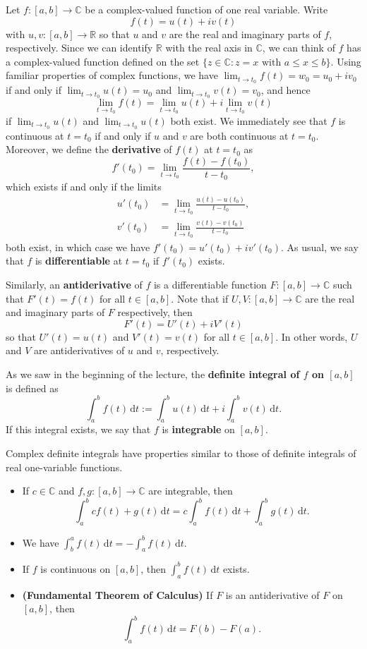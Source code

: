 \documentclass[10pt]{article}
\newcommand{\R}{\mathbb{R}}
\newcommand{\C}{\mathbb{C}}
\newcommand{\dd}{\,\mathrm{d}}
\theoremstyle{newstyle}
\begin{document}
Let $f : [a, b] \to \C$ be a complex-valued function of one real variable. Write 
\[ f(t) = u(t) + iv(t) \]
with $u, v : [a, b] \to \R$ so that $u$ and $v$ are the real and imaginary parts of $f$, respectively. 
Since we can identify $\R$ with the real axis in $\C$, we can think of $f$ has a complex-valued 
function defined on the set $\{z \in \C : z = x \text{ with } a \leq x \leq b\}$. 
Using familiar properties of complex functions, we have $\lim_{t\to t_0} f(t) 
= w_0 = u_0 + iv_0$ if and only if $\lim_{t\to t_0} u(t) = u_0$ and 
$\lim_{t\to t_0} v(t) = v_0$, and hence 
\[ \lim_{t\to t_0} f(t) = \lim_{t\to t_0} u(t) + i \lim_{t\to t_0} v(t) \]
if $\lim_{t\to t_0} u(t)$ and $\lim_{t\to t_0} u(t)$ both exist. We immediately see that $f$ 
is continuous at $t = t_0$ if and only if $u$ and $v$ are both continuous at $t = t_0$. 
Moreover, we define the {\bf derivative} of $f(t)$ at $t = t_0$ as 
\[ f'(t_0) = \lim_{t\to t_0} \frac{f(t) - f(t_0)}{t - t_0}, \]
which exists if and only if the limits
\begin{align*}
    u'(t_0) &= \lim_{t\to t_0} \frac{u(t) - u(t_0)}{t - t_0}, \\
    v'(t_0) &= \lim_{t\to t_0} \frac{v(t) - v(t_0)}{t - t_0}
\end{align*}
both exist, in which case we have $f'(t_0) = u'(t_0) + iv'(t_0)$. 
As usual, we say that $f$ is {\bf differentiable} at $t = t_0$ if $f'(t_0)$ exists. 

Similarly, an {\bf antiderivative} of $f$ is a differentiable function $F : [a, b] \to \C$ 
such that $F'(t) = f(t)$ for all $t \in [a, b]$. Note that if $U, V : [a, b] \to \C$ are the 
real and imaginary parts of $F$ respectively, then 
\[ F'(t) = U'(t) + iV'(t) \]
so that $U'(t) = u(t)$ and $V'(t) = v(t)$ for all $t \in [a, b]$. In other words, $U$ and $V$ 
are antiderivatives of $u$ and $v$, respectively. 

As we saw in the beginning of the lecture, the {\bf definite integral of $f$ on $[a, b]$} is 
defined as 
\[ \int_a^b f(t)\dd t := \int_a^b u(t)\dd t + i \int_a^b v(t)\dd t. \]
If this integral exists, we say that $f$ is {\bf integrable} on $[a, b]$. 

Complex definite integrals have properties similar to those of definite integrals of 
real one-variable functions. 
\begin{itemize}
    \item If $c \in \C$ and $f, g : [a, b] \to \C$ are integrable, then 
    \[ \int_a^b cf(t) + g(t)\dd t = c\int_a^b f(t)\dd t + \int_a^b g(t)\dd t. \]
    \item We have $\int_b^a f(t)\dd t = -\int_a^b f(t)\dd t$. 
    \item If $f$ is continuous on $[a, b]$, then $\int_a^b f(t)\dd t$ exists. 
    \item {\bf (Fundamental Theorem of Calculus)} If $F$ is an antiderivative of $F$ on $[a, b]$, then
    \[ \int_a^b f(t)\dd t = F(b) - F(a). \]
\end{itemize}
\end{document}
